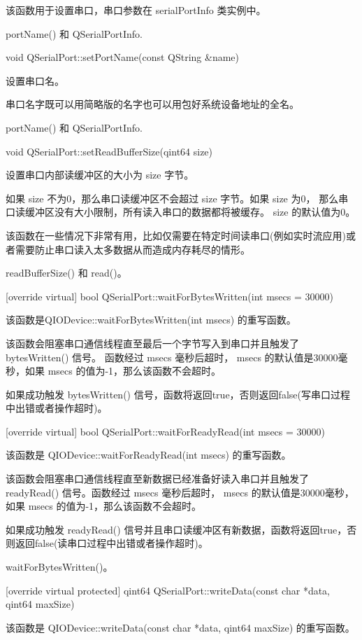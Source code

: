 该函数用于设置串口，串口参数在 serialPortInfo 类实例中。

\begin{seeAlso}
portName() 和 QSerialPortInfo.
\end{seeAlso}

void QSerialPort::setPortName(const QString \&name)

设置串口名。

串口名字既可以用简略版的名字也可以用包好系统设备地址的全名。

\begin{seeAlso}
portName() 和 QSerialPortInfo.
\end{seeAlso}

void QSerialPort::setReadBufferSize(qint64 size)

设置串口内部读缓冲区的大小为 size 字节。

如果 size 不为0，那么串口读缓冲区不会超过 size 字节。如果 size 为0，
那么串口读缓冲区没有大小限制，所有读入串口的数据都将被缓存。 size 的默认值为0。

该函数在一些情况下非常有用，比如仅需要在特定时间读串口(例如实时流应用)或者需要防止串口读入太多数据从而造成内存耗尽的情形。

\begin{seeAlso}
readBufferSize() 和 read()。
\end{seeAlso}

[override virtual] bool QSerialPort::waitForBytesWritten(int msecs = 30000)

该函数是QIODevice::waitForBytesWritten(int msecs) 的重写函数。

该函数会阻塞串口通信线程直至最后一个字节写入到串口并且触发了 bytesWritten() 信号。
函数经过 msecs 毫秒后超时， msecs 的默认值是30000毫秒，如果 msecs 的值为-1，那么该函数不会超时。

如果成功触发 bytesWritten() 信号，函数将返回true，否则返回false(写串口过程中出错或者操作超时)。

[override virtual] bool QSerialPort::waitForReadyRead(int msecs = 30000)

该函数是 QIODevice::waitForReadyRead(int msecs) 的重写函数。

该函数会阻塞串口通信线程直至新数据已经准备好读入串口并且触发了 readyRead() 信号。函数经过 msecs 毫秒后超时， msecs 的默认值是30000毫秒，如果 msecs 的值为-1，那么该函数不会超时。

如果成功触发 readyRead() 信号并且串口读缓冲区有新数据，函数将返回true，否则返回false(读串口过程中出错或者操作超时)。

\begin{seeAlso}
waitForBytesWritten()。
\end{seeAlso}

[override virtual protected] qint64 QSerialPort::writeData(const char *data, qint64 maxSize)

该函数是 QIODevice::writeData(const char *data, qint64 maxSize) 的重写函数。